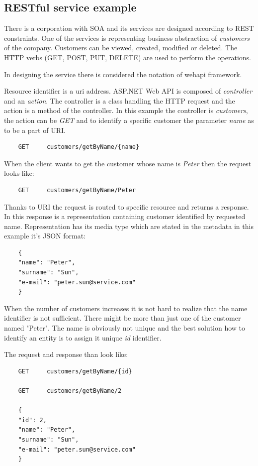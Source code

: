 \subsection{RESTful service example}
There is a corporation with SOA and its services are designed according to REST constraints. One of the services is representing business abstraction of \emph{customers} of the company. Customers can be viewed, created, modified or deleted. The HTTP verbs (GET, POST, PUT, DELETE) are used to perform the operations. 

In designing the service there is considered the notation of \gls{webapi} \gls{framework}. 

Resource identifier is a \gls{uri} address. ASP.NET Web API is composed of \emph{controller} and an \emph{action}. The controller is a class handling the HTTP request and the action is a method of the controller. In this example the controller is \emph{customers}, the action can be \emph{GET} and to identify a specific customer the parameter \emph{name} as to be a part of URI.

\begin{lstlisting}
    GET     customers/getByName/{name} 
\end{lstlisting}

When the client wants to get the customer whose name is \emph{Peter} then the request looks like:

\begin{lstlisting}
    GET     customers/getByName/Peter 
\end{lstlisting}

Thanks to URI the request is routed to specific resource and returns a response. In this response is a representation containing customer identified by requested name. Representation has its media type which are stated in the metadata in this  example it's JSON format:

\begin{lstlisting}
    { 
    "name": "Peter",
    "surname": "Sun",
    "e-mail": "peter.sun@service.com" 
    }
\end{lstlisting}

When the number of customers increases it is not hard to realize that the name identifier is not sufficient. There might be more than just one of the customer named "Peter". The name is obviously not unique and the best solution how to identify an entity is to assign it unique \emph{id} identifier. 

The request and response than look like:
\begin{lstlisting}
    GET     customers/getByName/{id} 
    
    GET     customers/getByName/2 
    
    { 
    "id": 2,
    "name": "Peter",
    "surname": "Sun",
    "e-mail": "peter.sun@service.com" 
    }
\end{lstlisting}


